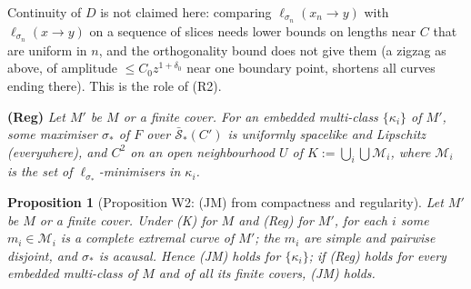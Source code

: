 \documentclass[aps,prd,onecolumn,superscriptaddress,nofootinbib,amsmath,amssymb,11pt]{revtex4-2}
\newtheorem{proposition}[theorem]{Proposition}
\theoremstyle{definition}
\begin{document}
Continuity of $D$ is not claimed here: comparing $\ell_{\sigma_n}(x_n\to y)$ with $\ell_{\sigma_n}(x\to y)$ on a sequence of slices needs
lower bounds on lengths near $C$ that are uniform in $n$, and the orthogonality bound does not give them (a zigzag as above, of
amplitude $\le C_0z^{1+\delta_0}$ near one boundary point, shortens all curves ending there). This is the role of (R2).

\textbf{(Reg)} \emph{Let $M'$ be $M$ or a finite cover. For an embedded multi-class $\{\kappa_i\}$ of $M'$, some maximiser $\sigma_*$ of $F$ over
$\bar{\mathcal S}_*(C')$ is uniformly spacelike and Lipschitz (everywhere), and $C^2$ on an open neighbourhood $U$ of
$K:=\bigcup_i\bigcup\mathcal M_i$, where $\mathcal M_i$ is the set of $\ell_{\sigma_*}$-minimisers in $\kappa_i$.}

\begin{proposition}[Proposition W2: (JM) from compactness and regularity]\label{prop:W2}
Let $M'$ be $M$ or a finite cover. Under (K) for $M$ and (Reg) for $M'$, for each $i$ some $m_i\in\mathcal M_i$ is a complete extremal
curve of $M'$; the $m_i$ are simple and pairwise disjoint, and $\sigma_*$ is acausal. Hence (JM) holds for $\{\kappa_i\}$; if (Reg) holds
for every embedded multi-class of $M$ and of all its finite covers, (JM) holds.
\end{proposition}
\end{document}
